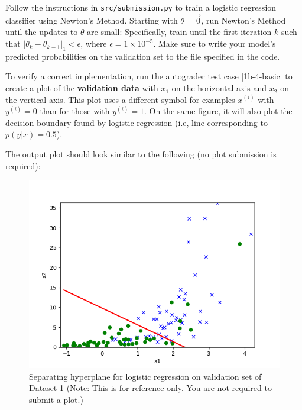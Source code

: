 \item {}
Follow the instructions in \texttt{src/submission.py} to train a logistic regression classifier using Newton's Method. Starting with $\theta = \vec{0}$, run Newton's Method until the updates to $\theta$ are small: Specifically,  train until the first iteration $k$ such that $\vert\theta_{k} - \theta_{k-1}\vert_1 < \epsilon$, where $\epsilon = 1\times 10^{-5}$. Make sure to write your model's predicted probabilities on the validation set to the file specified in the code.

To verify a correct implementation, run the autograder test case |1b-4-basic| to create a plot of the \textbf{validation data} with $x_1$ on the horizontal axis and $x_2$ on the vertical axis. This plot uses a different symbol for examples $x^{(i)}$ with $y^{(i)} = 0$ than for those with $y^{(i)} = 1$. On the same figure, it will also plot the decision boundary found by logistic regression (i.e, line corresponding to $p(y\vert x) = 0.5$).

The output plot should look similar to the following (no plot submission is required): 

\begin{figure}[H]
	\centering
	\vspace{2mm}
	\includegraphics[width=0.65\linewidth]{01-linearclass/p01b_pred_1.png}
    \caption{Separating hyperplane for logistic regression on validation set of Dataset 1 (Note: This is for reference only.  You are not required to submit a plot.)}
\end{figure}
